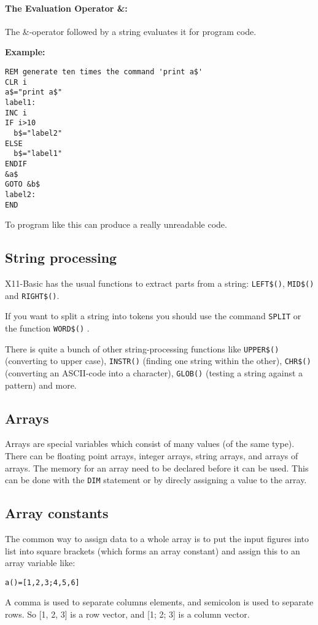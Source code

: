 \paragraph{The Evaluation Operator \&:}
The \&-operator followed by a string evaluates it for program code.\\
\begin{mdframed}[hidealllines=true,backgroundcolor=blue!20]
 {\bf Example:}
\begin{verbatim}
REM generate ten times the command 'print a$'
CLR i
a$="print a$"
label1:
INC i
IF i>10 
  b$="label2"
ELSE
  b$="label1"
ENDIF
&a$
GOTO &b$
label2:
END
\end{verbatim}\end{mdframed}
To program like this can produce a really unreadable code.


\subsection{String processing}

X11-Basic has the usual functions to extract parts from a string: 
\verb|LEFT$()|, \verb|MID$()| and \verb|RIGHT$()|. 

If you want to split a string into tokens you should use the command
\verb|SPLIT| or the function \verb|WORD$()| .

There is quite a bunch of other string-processing functions like 
\verb|UPPER$()| (converting to upper case), \verb|INSTR()| (finding one
string within the other), \verb|CHR$()| (converting an ASCII-code into a
character), \verb|GLOB()| (testing a string against a pattern) and more. 


\subsection{Arrays}
Arrays are special variables which consist of many values (of the same type).
There can be floating point arrays, integer arrays, string arrays, and arrays 
of arrays. The memory for an array need to be declared before it can be used. 
This can be done with the \verb|DIM| statement or by direcly assigning a value 
to the array.

\subsection*{Array constants}

The common way to assign data to a whole array is to put the input
figures into list into square brackets (which forms an array constant) and
assign this to an array variable like:
\begin{mdframed}[hidealllines=true,backgroundcolor=blue!20]
\begin{verbatim}
a()=[1,2,3;4,5,6]
\end{verbatim}
\end{mdframed}
A comma is used to separate columns elements, and semicolon is used to 
separate rows. So [1, 2, 3] is a row vector, and [1; 2; 3] is a column vector.

